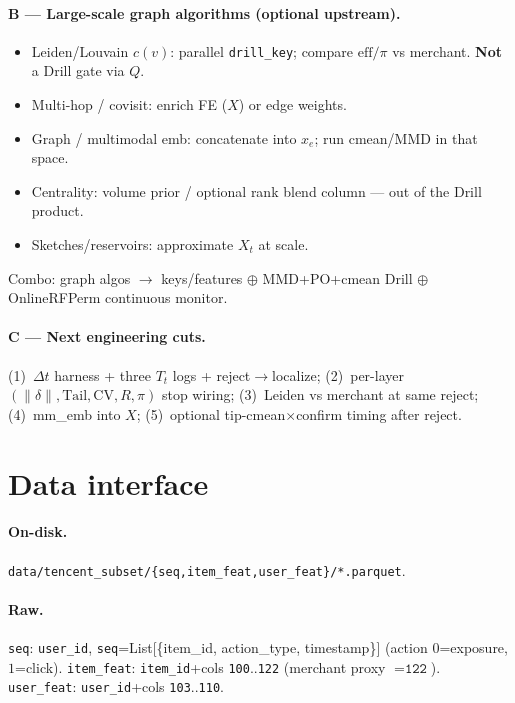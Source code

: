 \documentclass[11pt]{article}
\begin{document}
\paragraph{B --- Large-scale graph algorithms (optional upstream).}
\begin{itemize}[leftmargin=*,itemsep=0.25em]
  \item Leiden/Louvain $c(v)$: parallel \texttt{drill\_key}; compare
        $\mathrm{eff}/\pi$ vs merchant. \textbf{Not} a Drill gate via $Q$.
  \item Multi-hop / covisit: enrich FE ($X$) or edge weights.
  \item Graph / multimodal emb: concatenate into $x_e$; run cmean/MMD
        in that space.
  \item Centrality: volume prior / optional rank blend column --- out of
        the Drill product.
  \item Sketches/reservoirs: approximate $X_t$ at scale.
\end{itemize}
Combo: graph algos $\to$ keys/features
$\oplus$ MMD+PO+cmean Drill
$\oplus$ OnlineRFPerm continuous monitor.

\paragraph{C --- Next engineering cuts.}
(1)~$\Delta t$ harness + three $T_t$ logs + reject$\to$localize;
(2)~per-layer $(\|\delta\|,\mathrm{Tail},\mathrm{CV},R,\pi)$ stop wiring;
(3)~Leiden vs merchant at same reject;
(4)~mm\_emb into $X$;
(5)~optional tip-cmean$\times$confirm timing after reject.

\section{Data interface}

\paragraph{On-disk.}
\texttt{data/tencent\_subset/\{seq,item\_feat,user\_feat\}/*.parquet}.

\paragraph{Raw.}
\texttt{seq}: \texttt{user\_id}, \texttt{seq}=List[\{item\_id, action\_type, timestamp\}]
(action $0$=exposure, $1$=click).
\texttt{item\_feat}: \texttt{item\_id}+cols \texttt{100}..\texttt{122}
(merchant proxy $=\texttt{122}$).
\texttt{user\_feat}: \texttt{user\_id}+cols \texttt{103}..\texttt{110}.
\end{document}
